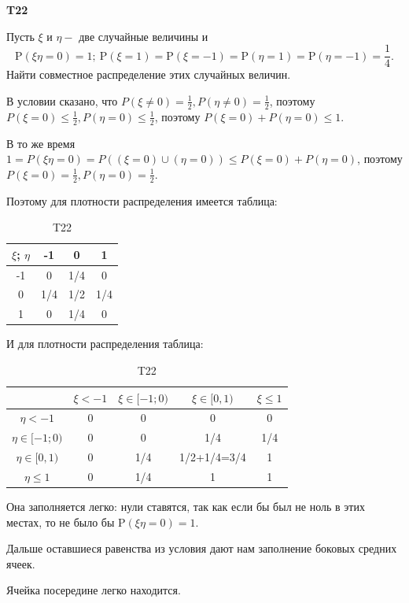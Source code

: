 \documentclass[a4paper,12pt]{article} %
\begin{document}
\begin{example}\textbf{T22}


Пусть $\xi$ и $\eta-$ две случайные величины и 
$$\mathrm{P}(\xi \eta=0)=1; \
\mathrm{P}(\xi=1)=\mathrm{P}(\xi=-1)=\mathrm{P}(\eta=1)=
\mathrm{P}(\eta=-1)=\frac{1}{4}.$$ 
Найти совместное распределение этих случайных величин.

В условии сказано, что $ P(\xi\ne 0)=\frac{1}{2}, P(\eta\ne 0)=\frac{1}{2}$, поэтому 
$ P(\xi = 0) \le \frac{1}{2}, P(\eta = 0) \le \frac{1}{2}$, поэтому $P(\xi = 0) + P(\eta = 0) \le 1$.


В то же время $ 1= P(\xi \eta =0) = P((\xi=0)\cup (\eta=0))\le P(\xi = 0) + P(\eta = 0)$, 
поэтому $ P(\xi = 0)=\frac{1}{2}, P(\eta = 0)=\frac{1}{2}$.

Поэтому для плотности распределения имеется таблица:
\begin{table}[H]
\centering
\begin{tabular}{|c|c|c|c|}
	\hline
$ \xi$\textdownarrow; $\eta  $ \textrightarrow	&-1  & 0 & 1   \\ \hline
-1	& 0 & 1/4 & 0   \\ \hline
0   & 1/4 & 1/2 & 1/4 \\ \hline
1	& 0  & 1/4 & 0  \\ \hline
\end{tabular}
\caption{T22}
\end{table}

И для плотности распределения таблица:
\begin{table}[h!]
\centering
\begin{tabular}{|c|c|c|c|c|}
	\hline
	& $\xi<-1$ & $\xi\in[-1;0)$ & $\xi\in [0,1)$ & $\xi\le 1$ \\ \hline
	$\eta <-1$       & 0        & 0              & 0              & 0          \\ \hline
	$\eta \in[-1;0)$ & 0        & 0              & 1/4            & 1/4        \\ \hline
	$\eta \in [0,1)$ & 0        & 1/4            & 1/2+1/4=3/4    & 1          \\ \hline
	$\eta \le 1$     & 0        & 1/4            & 1              & 1          \\ \hline
\end{tabular}
\caption{T22}
\end{table}

Она заполняется легко: нули ставятся, так как если бы был не ноль в этих местах, то не было бы $ \mathrm{P}(\xi \eta=0)=1$.

Дальше оставшиеся равенства из условия дают нам заполнение боковых средних ячеек.

Ячейка посередине легко находится.

\end{example}
\end{document}
